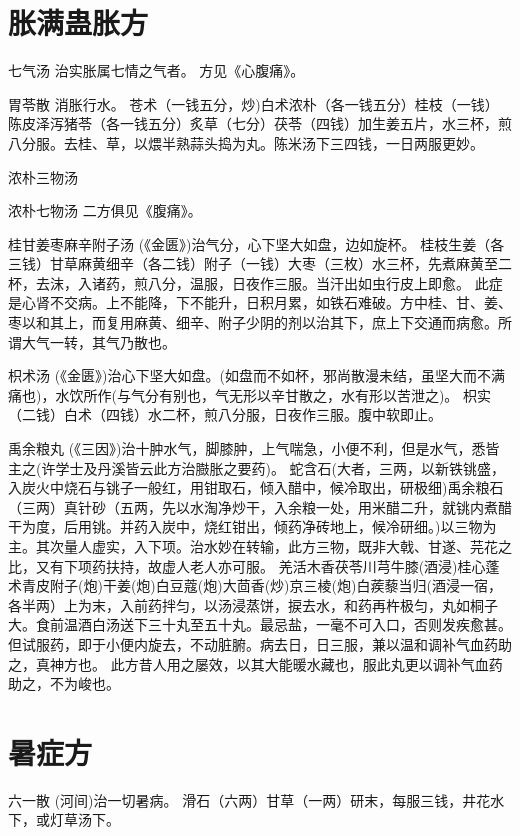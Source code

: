 \documentclass[a4paper,12pt,UTF8,twoside]{ctexbook}
\begin{document}
	\chapter{胀满蛊胀方}
	   七气汤
	治实胀属七情之气者。
	方见《心腹痛》。
	
	胃苓散
	消胀行水。
	苍术（一钱五分，炒)白术浓朴（各一钱五分）桂枝（一钱）陈皮泽泻猪苓（各一钱五分）炙草（七分）茯苓（四钱）加生姜五片，水三杯，煎八分服。去桂、草，以煨半熟蒜头捣为丸。陈米汤下三四钱，一日两服更妙。
	
	浓朴三物汤
	
	浓朴七物汤
	二方俱见《腹痛》。
	
	桂甘姜枣麻辛附子汤
	(《金匮》)治气分，心下坚大如盘，边如旋杯。
	桂枝生姜（各三钱）甘草麻黄细辛（各二钱）附子（一钱）大枣（三枚）水三杯，先煮麻黄至二杯，去沫，入诸药，煎八分，温服，日夜作三服。当汗出如虫行皮上即愈。
	此症是心肾不交病。上不能降，下不能升，日积月累，如铁石难破。方中桂、甘、姜、枣以和其上，而复用麻黄、细辛、附子少阴的剂以治其下，庶上下交通而病愈。所谓大气一转，其气乃散也。
	
	枳术汤
	(《金匮》)治心下坚大如盘。(如盘而不如杯，邪尚散漫未结，虽坚大而不满痛也)，水饮所作(与气分有别也，气无形以辛甘散之，水有形以苦泄之)。
	枳实（二钱）白术（四钱）水二杯，煎八分服，日夜作三服。腹中软即止。
	
	禹余粮丸
	(《三因》)治十肿水气，脚膝肿，上气喘急，小便不利，但是水气，悉皆主之(许学士及丹溪皆云此方治臌胀之要药)。
	蛇含石(大者，三两，以新铁铫盛，入炭火中烧石与铫子一般红，用钳取石，倾入醋中，候冷取出，研极细)禹余粮石（三两）真针砂（五两，先以水淘净炒干，入余粮一处，用米醋二升，就铫内煮醋干为度，后用铫。并药入炭中，烧红钳出，倾药净砖地上，候冷研细。)以三物为主。其次量人虚实，入下项。治水妙在转输，此方三物，既非大戟、甘遂、芫花之比，又有下项药扶持，故虚人老人亦可服。
	羌活木香茯苓川芎牛膝(酒浸)桂心蓬术青皮附子(炮)干姜(炮)白豆蔻(炮)大茴香(炒)京三棱(炮)白蒺藜当归(酒浸一宿，各半两）上为末，入前药拌匀，以汤浸蒸饼，捩去水，和药再杵极匀，丸如桐子大。食前温酒白汤送下三十丸至五十丸。最忌盐，一毫不可入口，否则发疾愈甚。但试服药，即于小便内旋去，不动脏腑。病去日，日三服，兼以温和调补气血药助之，真神方也。
	此方昔人用之屡效，以其大能暖水藏也，服此丸更以调补气血药助之，不为峻也。
	
	

	\chapter{暑症方}	
	
	六一散
	(河间)治一切暑病。
	滑石（六两）甘草（一两）研末，每服三钱，井花水下，或灯草汤下。
	
\end{document}
